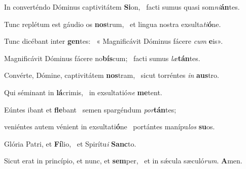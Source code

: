 \item In converténdo Dóminus captivitátem \textbf{Si}on,~\psstar{} facti sumus quasi som\textit{ni}\textbf{án}tes.

\item Tunc replétum est gáudio os \textbf{nos}trum,~\psstar{} et lingua nostra exsulta\textit{ti}\textbf{ó}ne.

\item Tunc dicébant inter \textbf{gen}tes:~\psstar{} « Magnificávit Dóminus fácere \textit{cum} \textbf{e}is».

\item Magnificávit Dóminus fácere no\textbf{bís}cum;~\psstar{} facti sumus \textit{læ}\textbf{tán}tes.

\item Convérte, Dómine, captivitátem \textbf{nos}tram,~\psstar{} sicut torréntes \textit{in} \textbf{aus}tro.

\item Qui séminant in \textbf{lá}crimis,~\psstar{} in exsultatió\textit{ne} \textbf{me}tent.

\item Eúntes ibant et \textbf{fle}bant~\psstar{} semen spargéndum \textit{por}\textbf{tán}tes;

\item veniéntes autem vénient in exsultati\textbf{ó}ne~\psstar{} portántes manípu\textit{los} \textbf{su}os.

\item Glória Patri, et \textbf{Fí}lio,~\psstar{} et Spirítu\textit{i} \textbf{Sanc}to.

\item Sicut erat in princípio, et nunc, et \textbf{sem}per,~\psstar{} et in sǽcula sæculó\textit{rum}. \textbf{A}men.